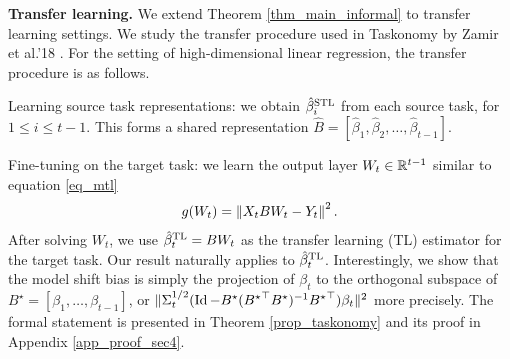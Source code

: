 \textbf{Transfer learning.}
We extend Theorem \ref{thm_main_informal} to transfer learning settings.
We study the transfer procedure used in Taskonomy by Zamir et al.'18 \cite{ZSSGM18}.
For the setting of high-dimensional linear regression, the transfer procedure is as follows.
\squishlist
	\item Learning source task representations: we obtain $\hat{\beta}_i^{\text{STL}}$ from each source task, for $1\le i \le t-1$.
		This forms a shared representation $\hat{B} = [\hat{\beta}_1,\hat{\beta}_2,\dots,\hat{\beta}_{t-1}]$.
	\item Fine-tuning on the target task: we learn the output layer $W_t\in\mathbb{R}^{t-1}$ similar to equation \eqref{eq_mtl}
		\begin{align}
			g(W_t) = \left\| X_t B W_t - Y_t \right\|^2.
		\end{align}
\squishend
After solving $W_t$, we use $\hat{\beta}_t^{\text{TL}} = B W_t$ as the transfer learning (TL) estimator for the target task.
Our result naturally applies to $\hat{\beta}_t^{\text{TL}}$.
Interestingly, we show that the model shift bias is simply the projection of $\beta_t$ to the orthogonal subspace of $B^{\star} = [\beta_1,\dots,\beta_{t-1}]$, or $\|\Sigma_t^{1/2}(\operatorname{Id} - B^{\star}({B^{\star}}^{\top}B^{\star})^{-1}{B^{\star}}^{\top})\beta_t\|^2$ more precisely.
The formal statement is presented in Theorem \ref{prop_taskonomy} and its proof in Appendix \ref{app_proof_sec4}.
